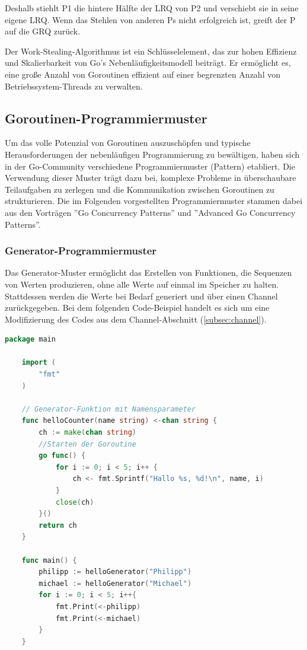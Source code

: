 \documentclass[fontsize=12pt,paper=a4,twoside=semi,parskip=half-,headsepline,headinclude]{scrreprt}
\begin{document}
Deshalb stiehlt P1 die hintere Hälfte der LRQ von P2 und verschiebt sie in seine eigene LRQ. Wenn das Stehlen von anderen Ps nicht erfolgreich ist, greift der P auf die GRQ zurück.

Der Work-Stealing-Algorithmus ist ein Schlüsselelement, das zur hohen Effizienz und Skalierbarkeit von Go's Nebenläufigkeitsmodell beiträgt. Er ermöglicht es, eine große Anzahl von Goroutinen effizient auf einer begrenzten Anzahl von Betriebssystem-Threads zu verwalten.

\subsection{Goroutinen-Programmiermuster}

Um das volle Potenzial von Goroutinen auszuschöpfen und typische Herausforderungen der nebenläufigen Programmierung zu bewältigen, haben sich in der Go-Community verschiedene Programmiermuster (Pattern) etabliert. Die Verwendung dieser Muster trägt dazu bei, komplexe Probleme in überschaubare Teilaufgaben zu zerlegen und die Kommunikation zwischen Goroutinen zu strukturieren. Die im Folgenden vorgestellten Programmiermuster stammen dabei aus den Vorträgen ''Go Concurrency Patterns''\cite{Pike2012} und ''Advanced Go Concurrency Patterns''\cite{Ajmani2013}.

\subsubsection{Generator-Programmiermuster}
\label{subsubsec:generator}

Das Generator-Muster ermöglicht das Erstellen von Funktionen, die Sequenzen von Werten produzieren, ohne alle Werte auf einmal im Speicher zu halten. Stattdessen werden die Werte bei Bedarf generiert und über einen Channel zurückgegeben. Bei dem folgenden Code-Beispiel handelt es sich um eine Modifizierung des Codes aus dem Channel-Abschnitt (\ref{subsec:channel}).

\begin{lstlisting}[language=Go,extendedchars=true]
	package main
	
	import (
		"fmt"
	)

	// Generator-Funktion mit Namensparameter
	func helloCounter(name string) <-chan string {
		ch := make(chan string)
		//Starten der Goroutine
		go func() {
			for i := 0; i < 5; i++ {
				ch <- fmt.Sprintf("Hallo %s, %d!\n", name, i)
			}
			close(ch)
		}()
		return ch
	}

	func main() {
		philipp := helloGenerator("Philipp")
		michael := helloGenerator("Michael")
		for i := 0; i < 5; i++{
			fmt.Print(<-philipp)
			fmt.Print(<-michael)
		}
	}
\end{lstlisting}
\end{document}

